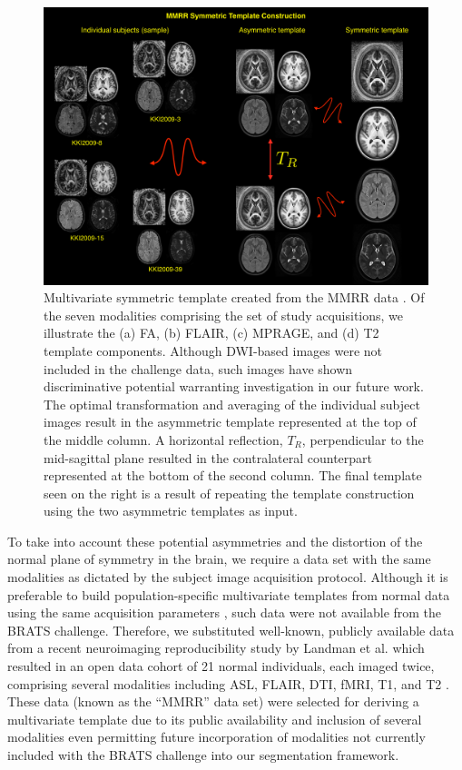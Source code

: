 \documentclass[preprint,authoryear,review,12pt]{elsarticle}
\begin{document}
\begin{figure}
    \centerline{\includegraphics[width=130mm]{templateKirby.pdf}}
  \caption{Multivariate symmetric template created from the MMRR 
           data \citep{landman2011}.  Of the seven modalities 
           comprising the set of study acquisitions, we illustrate the
           (a) FA, (b) FLAIR, (c) MPRAGE, and (d) T2 template components.
           Although DWI-based images were not included in the challenge data, 
           such images have shown discriminative potential \citep{price2003,cha2005} 
           warranting investigation in our future work.  
           The optimal transformation and averaging of the individual 
           subject images result in the asymmetric template represented at 
           the top of the middle column.  A horizontal reflection, $T_R$,
           perpendicular to the mid-sagittal plane  resulted in the 
           contralateral counterpart represented
           at the bottom of the second column.  The final template seen on
           the right is a result of repeating the template construction using
           the two asymmetric templates as input.
          }
  \label{fig:symmetrictemplates}
\end{figure}


To take into account these potential asymmetries and the distortion of 
the normal plane of symmetry in the brain, we 
require a data set with the same modalities as dictated
by the subject image acquisition protocol.  Although it
is preferable to build population-specific multivariate
templates from normal data using the same acquisition 
parameters \citep{avants2010}, such data were not available
from the BRATS challenge.  Therefore, we substituted well-known,
publicly available data from a recent neuroimaging reproducibility study
by Landman et al. which resulted in an open data cohort of 21
normal individuals, each imaged twice, comprising several
modalities including ASL, FLAIR, DTI, fMRI, T1, and T2 
\citep{landman2011}.  These data (known as the
``MMRR'' data set) were selected for deriving
a multivariate template due to its public availability and
inclusion of several modalities even permitting future 
incorporation of modalities 
not currently included with the BRATS challenge into our 
segmentation framework.  
\end{document}
